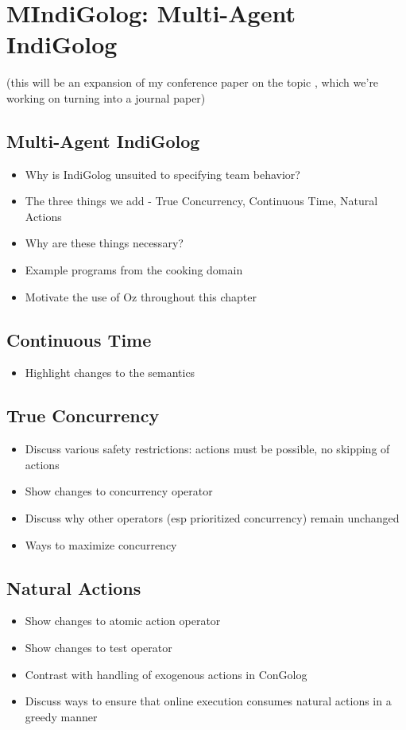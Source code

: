 \chapter{MIndiGolog: Multi-Agent IndiGolog}\label{ch:mindigolog}

(this will be an expansion of my conference paper on the topic \cite{kelly06hlp_dps}, which we're working on turning into a journal paper)

\section{Multi-Agent IndiGolog}
\begin{itemize}
\item Why is IndiGolog unsuited to specifying team behavior?
\item The three things we add - True Concurrency, Continuous Time, Natural Actions
\item Why are these things necessary?
\item Example programs from the cooking domain
\item Motivate the use of Oz throughout this chapter
\end{itemize}

\section{Continuous Time}
\begin{itemize}
\item Highlight changes to the semantics
\end{itemize}

\section{True Concurrency}
\begin{itemize}
\item Discuss various safety restrictions: actions must be possible, no skipping of actions
\item Show changes to concurrency operator
\item Discuss why other operators (esp prioritized concurrency) remain unchanged
\item Ways to maximize concurrency
\end{itemize}

\section{Natural Actions}
\begin{itemize}
\item Show changes to atomic action operator
\item Show changes to test operator
\item Contrast with handling of exogenous actions in ConGolog
\item Discuss ways to ensure that online execution consumes natural actions
in a greedy manner
\end{itemize}

